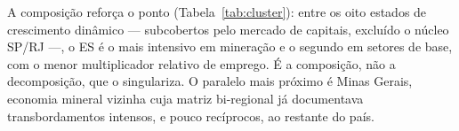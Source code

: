 \documentclass[11pt,a4paper]{article}
\begin{document}
A composição reforça o ponto (Tabela~\ref{tab:cluster}): entre os oito estados de crescimento
dinâmico --- subcobertos pelo mercado de capitais, excluído o núcleo SP/RJ ---, o ES é o mais
intensivo em mineração e o segundo em setores de base, com o menor multiplicador relativo de
emprego. É a composição, não a decomposição, que o singulariza. O paralelo mais próximo é
Minas Gerais, economia mineral vizinha cuja matriz bi-regional \citep{domingues2002matriz}
já documentava transbordamentos intensos, e pouco recíprocos, ao restante do país.
\end{document}

